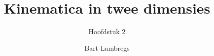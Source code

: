 


\title{Kinematica in twee dimensies}
\subtitle{Hoofdstuk 2}
\author{Bart Lambregs}
\date{}
\maketitle
{}